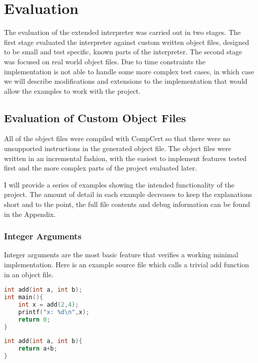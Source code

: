 \chapter{Evaluation}\label{eval}

The evaluation of the extended interpreter was carried out in two stages. The first stage evaluated the interpreter against custom written object files, designed to be small and test specific, known parts of the interpreter. The second stage was focused on real world object files. Due to time constraints the implementation is not able to handle some more complex test cases, in which case we will describe modifications and extensions to the implementation that would allow the examples to work with the project.

\section{Evaluation of Custom Object Files}

All of the object files were compiled with CompCert so that there were no unsupported instructions in the generated object file. The object files were written in an incremental fashion, with the easiest to implement features tested first and the more complex parts of the project evaluated later.

I will provide a series of examples showing the intended functionality of the project. The amount of detail in each example decreases to keep the explanations short and to the point, the full file contents and debug information can be found in the Appendix.

\subsection{Integer Arguments}

Integer arguments are the most basic feature that verifies a working minimal implementation. Here is an example source file which calls a trivial add function in an object file.
\begin{multicols}{2}
\begin{minipage}{0.5\textwidth}
\begin{lstlisting}[language=C, caption =call\_add.c]
int add(int a, int b);
int main(){
    int x = add(2,4);
    printf("x: %d\n",x);
    return 0;     
}
\end{lstlisting}
\end{minipage}
\begin{lstlisting}[language=C, caption=add.c]
int add(int a, int b){
    return a+b;
}
\end{lstlisting}
\end{multicols}

